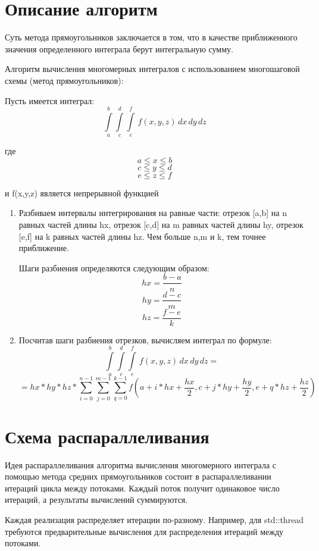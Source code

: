 \documentclass{report}
\begin{document}
\section*{Описание алгоритм}
Суть метода прямоугольников заключается в том, что в качестве приближенного значения определенного интеграла берут интегральную сумму.
\par Алгоритм вычисления многомерных интегралов с использованием многошаговой схемы (метод прямоугольников):
\par Пусть имеется интеграл:
$$\int\limits_a^b 
\int\limits_c^d 
\int\limits_e^f \,f(x,y,z)\,dx\,dy\,dz
$$
\par где 
$$ a\le x \le b $$
$$ c \le y \le d $$
$$ e \le z \le f $$
\par и f(x,y,z) является непрерывной функцией
\begin{enumerate}
\item Разбиваем интервалы интегрирования на равные части: отрезок [a,b] на n равных частей длины hx, отрезок [c,d] на m равных частей длины hy, отрезок [e,f] на k равных частей длины hz. Чем больше n,m и k, тем точнее приближение.
\par Шаги разбиения определяются следующим образом:
$$ hx=\frac{b-a}{n} $$
$$ hy=\frac{d-c}{m} $$
$$ hz=\frac{f-e}{k} $$
\item Посчитав шаги разбиения отрезков, вычисляем интеграл по формуле:
$$\int\limits_a^b 
\int\limits_c^d 
\int\limits_e^f \,f(x,y,z)\,dx\,dy\,dz=$$
$$ = hx*hy*hz*
\sum\limits_{i=0}^{n-1}
\sum\limits_{j=0}^{m-1}
\sum\limits_{q=0}^{k-1}
f(a+i*hx+\frac{hx}{2}, c+j*hy+\frac{hy}{2},e+q*hz+\frac{hz}{2})
$$
\end{enumerate}
\par
\par 
\newpage

\section*{Схема распараллеливания}
Идея распараллеливания алгоритма вычисления многомерного интеграла с помощью метода средних прямоугольников состоит в распараллеливании итераций цикла между потоками. Каждый поток получит одинаковое число итераций, а результаты вычислений суммируются.
\par Каждая реализация распределяет итерации по-разному. Например, для std::thread требуются предварительные вычисления для распределения итераций между потоками.
\newpage
\end{document}
